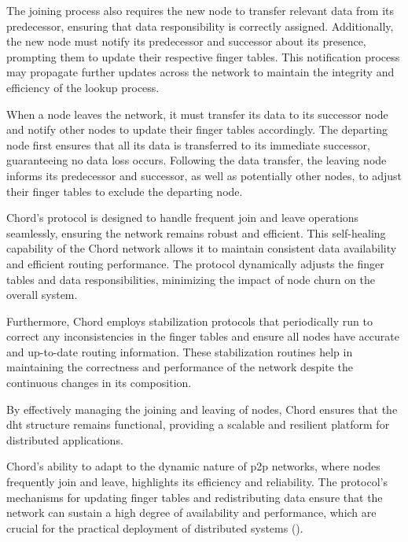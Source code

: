 The joining process also requires the new node to transfer relevant data from its predecessor, ensuring that data responsibility is correctly assigned.
Additionally, the new node must notify its predecessor and successor about its presence, prompting them to update their respective finger tables.
This notification process may propagate further updates across the network to maintain the integrity and efficiency of the lookup process.

When a node leaves the network, it must transfer its data to its successor node and notify other nodes to update their finger tables accordingly.
The departing node first ensures that all its data is transferred to its immediate successor, guaranteeing no data loss occurs.
Following the data transfer, the leaving node informs its predecessor and successor, as well as potentially other nodes, to adjust their finger tables to exclude the departing node.

Chord's protocol is designed to handle frequent join and leave operations seamlessly, ensuring the network remains robust and efficient.
This self-healing capability of the Chord network allows it to maintain consistent data availability and efficient routing performance.
The protocol dynamically adjusts the finger tables and data responsibilities, minimizing the impact of node churn on the overall system.

Furthermore, Chord employs stabilization protocols that periodically run to correct any inconsistencies in the finger tables and ensure all nodes have accurate and up-to-date routing information.
These stabilization routines help in maintaining the correctness and performance of the network despite the continuous changes in its composition.

By effectively managing the joining and leaving of nodes, Chord ensures that the \gls{dht} structure remains functional, providing a scalable and resilient platform for distributed applications.

Chord's ability to adapt to the dynamic nature of \gls{p2p} networks, where nodes frequently join and leave, highlights its efficiency and reliability.
The protocol's mechanisms for updating finger tables and redistributing data ensure that the network can sustain a high degree of availability and performance, which are crucial for the practical deployment of distributed systems (\cite{stoica2001}).